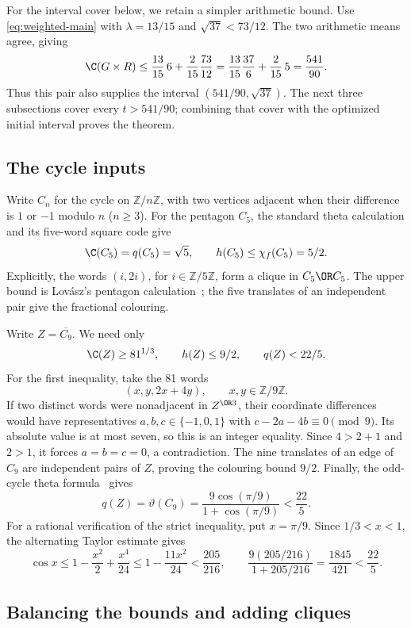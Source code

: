 For the interval cover below, we retain a simpler arithmetic bound.
Use \eqref{eq:weighted-main} with $\lambda=13/15$ and
$\sqrt{37}<73/12$. The two arithmetic means agree, giving
\[
 \C(G\times R)
 \le\frac{13}{15}\,6+\frac{2}{15}\frac{73}{12}
 =\frac{13}{15}\frac{37}{6}+\frac{2}{15}\,5
 =\frac{541}{90}.
\]
Thus this pair also supplies the interval $(541/90,\sqrt{37})$.
The next three subsections cover every $t>541/90$; combining that
cover with the optimized initial interval proves the theorem.

\subsection{The cycle inputs}

Write $C_n$ for the cycle on $\mathbb Z/n\mathbb Z$, with two vertices
adjacent when their difference is $1$ or $-1$ modulo $n$ ($n\ge3$).
For the pentagon $C_5$, the standard theta calculation and its five-word
square code give
\[
 \C(C_5)=q(C_5)=\sqrt5,\qquad h(C_5)\le\chi_f(C_5)=5/2.
\]
Explicitly, the words $(i,2i)$, for $i\in\mathbb Z/5\mathbb Z$, form
a clique in $C_5\OR C_5$. The upper bound is Lov\'asz's pentagon
calculation~\cite{Lovasz}; the five translates of an independent pair
give the fractional colouring.

Write $Z=\overline{C_9}$. We need only
\[
 \C(Z)\ge81^{1/3},\qquad h(Z)\le9/2,\qquad q(Z)<22/5.
\]
For the first inequality, take the 81 words
\[
 (x,y,2x+4y),\qquad x,y\in\mathbb Z/9\mathbb Z.
\]
If two distinct words were nonadjacent in $Z^{\OR3}$, their coordinate
differences would have representatives $a,b,c\in\{-1,0,1\}$ with
$c-2a-4b\equiv0\pmod9$. Its absolute value is at most seven, so this
is an integer equality. Since $4>2+1$ and $2>1$, it forces
$a=b=c=0$, a contradiction. The nine translates of an edge of $C_9$
are independent pairs of $Z$, proving the colouring bound $9/2$.
Finally, the odd-cycle theta formula~\cite{Lovasz} gives
\[
 q(Z)=\vartheta(C_9)
 =\frac{9\cos(\pi/9)}{1+\cos(\pi/9)}<\frac{22}{5}.
\]
For a rational verification of the strict inequality, put $x=\pi/9$.
Since $1/3<x<1$, the alternating Taylor estimate gives
\[
 \cos x\le1-\frac{x^2}{2}+\frac{x^4}{24}
 \le1-\frac{11x^2}{24}<\frac{205}{216},\qquad
 \frac{9(205/216)}{1+205/216}=\frac{1845}{421}<\frac{22}{5}.
\]

\subsection{Balancing the bounds and adding cliques}


